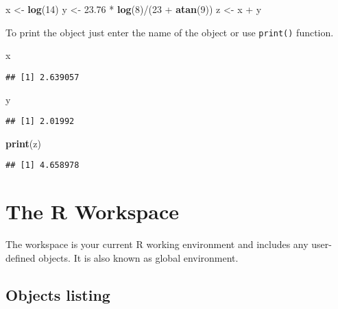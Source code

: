 \documentclass[]{book}
\newenvironment{Shaded}{\begin{snugshade}}{\end{snugshade}}
\newcommand{\KeywordTok}[1]{\textcolor[rgb]{0.13,0.29,0.53}{\textbf{{#1}}}}
\newcommand{\DecValTok}[1]{\textcolor[rgb]{0.00,0.00,0.81}{{#1}}}
\newcommand{\FloatTok}[1]{\textcolor[rgb]{0.00,0.00,0.81}{{#1}}}
\newcommand{\StringTok}[1]{\textcolor[rgb]{0.31,0.60,0.02}{{#1}}}
\newcommand{\NormalTok}[1]{{#1}}
\begin{document}
\begin{Shaded}
\begin{Highlighting}[]
\NormalTok{x <-}\StringTok{ }\KeywordTok{log}\NormalTok{(}\DecValTok{14}\NormalTok{)}
\NormalTok{y <-}\StringTok{ }\FloatTok{23.76} \NormalTok{*}\StringTok{ }\KeywordTok{log}\NormalTok{(}\DecValTok{8}\NormalTok{)/(}\DecValTok{23} \NormalTok{+}\StringTok{ }\KeywordTok{atan}\NormalTok{(}\DecValTok{9}\NormalTok{))}
\NormalTok{z <-}\StringTok{ }\NormalTok{x +}\StringTok{ }\NormalTok{y}
\end{Highlighting}
\end{Shaded}

To print the object just enter the name of the object or use
\texttt{print()} function.

\begin{Shaded}
\begin{Highlighting}[]
\NormalTok{x}
\end{Highlighting}
\end{Shaded}

\begin{verbatim}
## [1] 2.639057
\end{verbatim}

\begin{Shaded}
\begin{Highlighting}[]
\NormalTok{y}
\end{Highlighting}
\end{Shaded}

\begin{verbatim}
## [1] 2.01992
\end{verbatim}

\begin{Shaded}
\begin{Highlighting}[]
\KeywordTok{print}\NormalTok{(z)}
\end{Highlighting}
\end{Shaded}

\begin{verbatim}
## [1] 4.658978
\end{verbatim}

\section{The R Workspace}\label{the-r-workspace}

The workspace is your current R working environment and includes any
user-defined objects. It is also known as global environment.

\subsection{Objects listing}\label{objects-listing}
\end{document}
